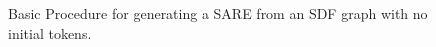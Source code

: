 \begin{figure}[p]
{\begin{minipage}{6.3in}
\end{minipage}}
\caption{Basic Procedure for generating a SARE from an SDF graph with no initial tokens.
\protect\label{fig:sdftosare}}
\end{figure}





